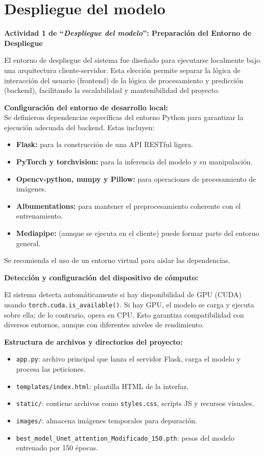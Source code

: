 \section{Despliegue del modelo}
\textbf{Actividad 1 de “\textit{Despliegue del modelo}”: Preparación del Entorno de Despliegue}

El entorno de despliegue del sistema fue diseñado para ejecutarse localmente bajo una arquitectura cliente-servidor. Esta elección permite separar la lógica de interacción del usuario (frontend) de la lógica de procesamiento y predicción (backend), facilitando la escalabilidad y mantenibilidad del proyecto.

\textbf{Configuración del entorno de desarrollo local:}
\\
Se definieron dependencias específicas del entorno Python para garantizar la ejecución adecuada del backend. Estas incluyen:
\begin{itemize}
\item \textbf{Flask:} para la construcción de una API RESTful ligera.
\item \textbf{PyTorch y torchvision:} para la inferencia del modelo y su manipulación.
\item \textbf{Opencv-python, numpy y Pillow:} para operaciones de procesamiento de imágenes.
\item \textbf{Albumentations:} para mantener el preprocesamiento coherente con el entrenamiento.
\item \textbf{Mediapipe:} (aunque se ejecuta en el cliente) puede formar parte del entorno general.
\end{itemize}
Se recomienda el uso de un entorno virtual para aislar las dependencias.

\textbf{Detección y configuración del dispositivo de cómputo:}

El sistema detecta automáticamente si hay disponibilidad de GPU (CUDA) usando \texttt{torch.cuda.is\_available()}. Si hay GPU, el modelo se carga y ejecuta sobre ella; de lo contrario, opera en CPU. Esto garantiza compatibilidad con diversos entornos, aunque con diferentes niveles de rendimiento.

\vspace{0.5em}
\textbf{Estructura de archivos y directorios del proyecto:}

\begin{itemize}
    \item \texttt{app.py}: archivo principal que lanza el servidor Flask, carga el modelo y procesa las peticiones.
    \item \texttt{templates/index.html}: plantilla HTML de la interfaz.
    \item \texttt{static/}: contiene archivos como \texttt{styles.css}, scripts JS y recursos visuales.
    \item \texttt{images/}: almacena imágenes temporales para depuración.
    \item \texttt{best\_model\_Unet\_attention\_Modificado\_150.pth}: pesos del modelo entrenado por 150 épocas.
\end{itemize}

